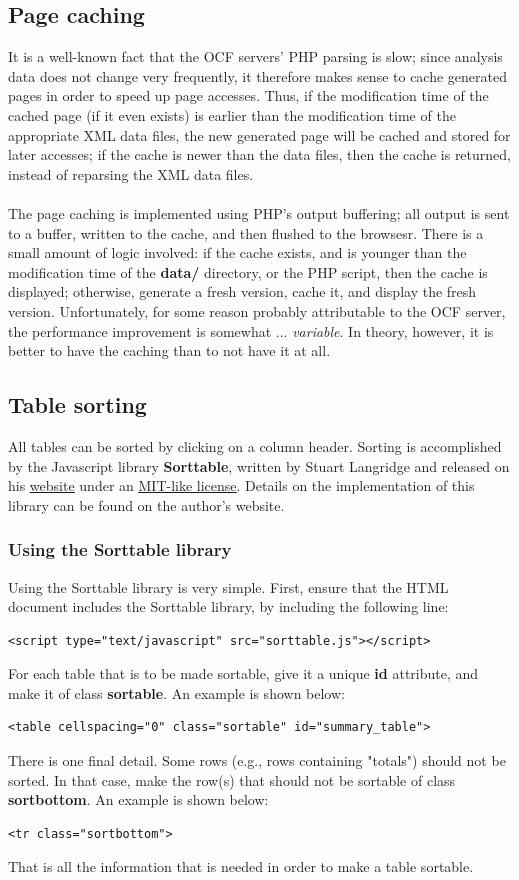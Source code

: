 \documentclass[11pt]{article}
\newcommand{\gchref}[2]{\textcolor{blue}{\underline{\href{#1}{#2}}}}
\begin{document}
\subsection{Page caching}
It is a well-known fact that the OCF servers' PHP parsing is slow; since analysis data does not change very frequently, it therefore makes sense to cache generated pages in order to speed up page accesses. Thus, if the modification time of the cached page (if it even exists) is earlier than the modification time of the appropriate XML data files, the new generated page will be cached and stored for later accesses; if the cache is newer than the data files, then the cache is returned, instead of reparsing the XML data files.\\\\
The page caching is implemented using PHP's output buffering; all output is sent to a buffer, written to the cache, and then flushed to the browsesr. There is a small amount of logic involved: if the cache exists, and is younger than the modification time of the \textbf{data/} directory, or the PHP script, then the cache is displayed; otherwise, generate a fresh version, cache it, and display the fresh version. Unfortunately, for some reason probably attributable to the OCF server, the performance improvement is somewhat ... \textit{variable}. In theory, however, it is better to have the caching than to not have it at all.
\subsection{Table sorting}
All tables can be sorted by clicking on a column header. Sorting is accomplished by the Javascript library \textbf{Sorttable}, written by Stuart Langridge and released on his \gchref{http://kryogenix.org/code/browser/sorttable/}{website} under an \gchref{http://www.kryogenix.org/code/browser/licence.html}{MIT-like license}. Details on the implementation of this library can be found on the author's website.
\subsubsection{Using the Sorttable library}
Using the Sorttable library is very simple. First, ensure that the HTML document includes the Sorttable library, by including the following line:
\begin{verbatim}
<script type="text/javascript" src="sorttable.js"></script>
\end{verbatim}
For each table that is to be made sortable, give it a unique \textbf{id} attribute, and make it of class \textbf{sortable}. An example is shown below:
\begin{verbatim}
<table cellspacing="0" class="sortable" id="summary_table">
\end{verbatim}
There is one final detail. Some rows (e.g., rows containing "totals") should not be sorted. In that case, make the row(s) that should not be sortable of class \textbf{sortbottom}. An example is shown below:
\begin{verbatim}
<tr class="sortbottom">
\end{verbatim}
That is all the information that is needed in order to make a table sortable.
\end{document}
